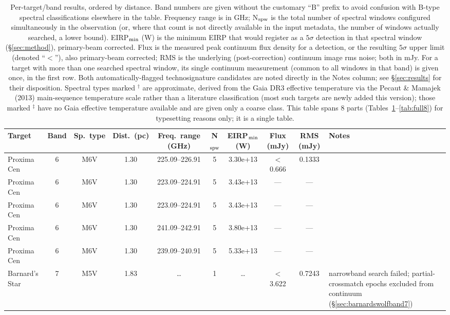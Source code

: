 \documentclass{openjournal}
\begin{document}
\begin{table}
\centering
\scriptsize
\caption{Per-target/band results, ordered by distance. Band numbers are
given without the customary ``B'' prefix to avoid confusion with B-type
spectral classifications elsewhere in the table. Frequency range is in
GHz; N$_{\rm spw}$ is the total number of spectral windows configured
simultaneously in the observation (or, where that count is not directly
available in the input metadata, the number of windows actually
searched, a lower bound). EIRP$_{\rm min}$ (W) is the minimum
EIRP that would register as a $5\sigma$ detection in that spectral
window (\S\ref{sec:method}), primary-beam corrected. Flux is the measured
peak continuum flux density for a detection, or the resulting $5\sigma$
upper limit (denoted ``$<$''), also primary-beam corrected; RMS is the
underlying (post-correction) continuum image rms noise; both in mJy. For
a target with more than one searched spectral window, its single
continuum measurement (common to all windows in that band) is given once,
in the first row. Both automatically-flagged technosignature candidates
are noted directly in the Notes column; see \S\ref{sec:results} for their
disposition. Spectral types marked $^\dagger$ are approximate, derived
from the Gaia DR3 effective temperature via the Pecaut \& Mamajek (2013)
main-sequence temperature scale rather than a literature classification
(most such targets are newly added this version); those marked $^\ddagger$
have no Gaia effective temperature available and are given only a coarse
class. This table spans 8 parts (Tables~\ref{tab:full}--\ref{tab:full8})
for typesetting reasons only; it is a single table.}
\label{tab:full}
\begin{tabularx}{\textwidth}{@{}l c c c c c c c c X@{}}
\hline
Target & Band & Sp.\ type & Dist.\ (pc) & Freq.\ range (GHz) & N$_{\rm spw}$ & EIRP$_{\rm min}$ (W) & Flux (mJy) & RMS (mJy) & Notes \\
\hline
Proxima Cen & 6 & M6V & 1.30 & 225.09--226.91 & 5 & 3.30e+13 & $<$0.666 & 0.1333 &  \\
Proxima Cen & 6 & M6V & 1.30 & 223.09--224.91 & 5 & 3.43e+13 & --- & --- &  \\
Proxima Cen & 6 & M6V & 1.30 & 223.09--224.91 & 5 & 3.43e+13 & --- & --- &  \\
Proxima Cen & 6 & M6V & 1.30 & 241.09--242.91 & 5 & 3.80e+13 & --- & --- &  \\
Proxima Cen & 6 & M6V & 1.30 & 239.09--240.91 & 5 & 5.33e+13 & --- & --- &  \\
Barnard's Star & 7 & M5V & 1.83 & \ldots & 1 & \ldots & $<$3.622 & 0.7243 & narrowband search failed; partial-crossmatch epochs excluded from continuum (\S\ref{sec:barnardswolfband7}) \\

\end{tabularx}
\end{table}
\end{document}
